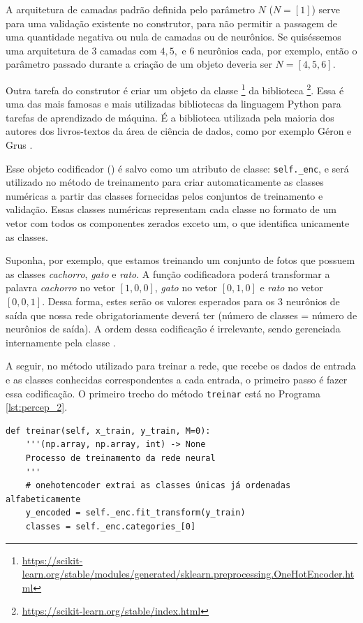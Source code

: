 A arquitetura de camadas padrão definida pelo parâmetro $N$ ($N=[1]$) serve para uma validação existente no construtor, para não permitir a passagem de uma quantidade negativa ou nula de camadas ou de neurônios. Se quiséssemos uma arquitetura de $3$ camadas com $4, 5, $ e $6$ neurônios cada, por exemplo, então o parâmetro passado durante a criação de um objeto  deveria ser $N = [4, 5, 6]$.

Outra tarefa do construtor é criar um objeto da classe \footnote{\url{https://scikit-learn.org/stable/modules/generated/sklearn.preprocessing.OneHotEncoder.html}} da biblioteca \footnote{\url{https://scikit-learn.org/stable/index.html}}. Essa é uma das mais famosas e mais utilizadas bibliotecas da linguagem Python para tarefas de aprendizado de máquina. É a biblioteca utilizada pela maioria dos autores dos livros-textos da área de ciência de dados, como por exemplo Géron \citep{hands} e Grus \citep{data}.

Esse objeto codificador () é salvo como um atributo de classe: \texttt{self.\_enc}, e será utilizado no método de treinamento para criar automaticamente as classes numéricas a partir das classes fornecidas pelos conjuntos de treinamento e validação. Essas classes numéricas representam cada classe no formato de um vetor com todos os componentes zerados exceto um, o que identifica unicamente as classes.

Suponha, por exemplo, que estamos treinando um conjunto de fotos que possuem as classes \emph{cachorro}, \emph{gato} e \emph{rato}. A função codificadora poderá transformar a palavra \emph{cachorro} no vetor $[1, 0, 0]$, \emph{gato} no vetor $[0, 1, 0]$ e \emph{rato} no vetor $[0, 0, 1]$. Dessa forma, estes serão os valores esperados para os $3$ neurônios de saída que nossa rede obrigatoriamente deverá ter (número de classes = número de neurônios de saída). A ordem dessa codificação é irrelevante, sendo gerenciada internamente pela classe .

A seguir, no método utilizado para treinar a rede, que recebe os dados de entrada e as classes conhecidas correspondentes a cada entrada, o primeiro passo é fazer essa codificação. O primeiro trecho do método \texttt{treinar} está no Programa \ref{lst:percep_2}.

\estiloR
\begin{lstlisting}[caption={Trecho da classe \eng{Perceptron}}, label={lst:percep_2}, escapeinside={\%}]
def treinar(self, x_train, y_train, M=0):
    '''(np.array, np.array, int) -> None
    Processo de treinamento da rede neural
    '''
    # onehotencoder extrai as classes únicas já ordenadas alfabeticamente
    y_encoded = self._enc.fit_transform(y_train)
    classes = self._enc.categories_[0]
\end{lstlisting}


